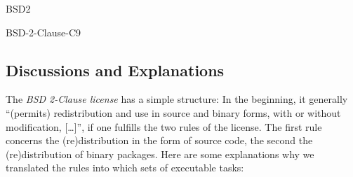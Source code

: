 \begin{license}{BSD2}
\begin{lsuc}{BSD-2-Clause-C9}
  \lsucmeans{\useCaseNine}
  \lsuccovers{\coversNine}

  \begin{lsucrequires}
    \lsucmandatory{\insertLicenseIntoBinary}\passingFilesCorrectly
    \lsucoptional{\addLibraryLicenseToCopyrightMessage}
    \lsucoptional{\keepBinariesSeparate}
  \end{lsucrequires}

  \lsucprohibitsnothing
\end{lsuc}

\end{license}


\subsection{Discussions and Explanations}
\label{BSD2Discussion}%
\label{BSD3Discussion}

The \textit{BSD 2-Clause license} has a simple structure: In the
beginning, it generally \enquote{(permits) redistribution and use in
source and binary forms, with or without modification, [\ldots]}, if one
fulfills the two rules of the license.\citeBSDsimple
The first rule concerns the (re)distribution in the form of source code, 
the second the (re)distribution of binary packages. Here are some
explanations why we translated the rules into which sets of executable tasks:

